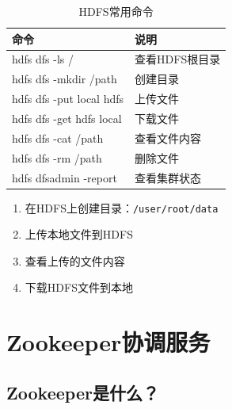 \documentclass[12pt,a4paper]{article}
\begin{document}
\begin{table}[H]
\centering
\caption{HDFS常用命令}
\begin{tabular}{ll}
\toprule
\textbf{命令} & \textbf{说明} \\
\midrule
hdfs dfs -ls / & 查看HDFS根目录 \\
hdfs dfs -mkdir /path & 创建目录 \\
hdfs dfs -put local hdfs & 上传文件 \\
hdfs dfs -get hdfs local & 下载文件 \\
hdfs dfs -cat /path & 查看文件内容 \\
hdfs dfs -rm /path & 删除文件 \\
hdfs dfsadmin -report & 查看集群状态 \\
\bottomrule
\end{tabular}
\end{table}

\begin{practicebox}[动手练习]
\begin{enumerate}
    \item 在HDFS上创建目录：\texttt{/user/root/data}
    \item 上传本地文件到HDFS
    \item 查看上传的文件内容
    \item 下载HDFS文件到本地
\end{enumerate}
\end{practicebox}

\section{Zookeeper协调服务}

\subsection{Zookeeper是什么？}
\end{document}
